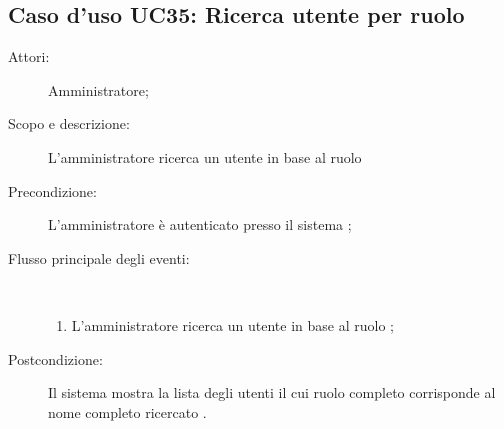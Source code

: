 \subsection{Caso d'uso UC35: Ricerca utente per ruolo}\begin{description}
	\item[Attori:] Amministratore;
	\item[Scopo e descrizione:] L'amministratore ricerca un utente in base al ruolo 
	
	\item[Precondizione:] L'amministratore è autenticato presso il sistema
	;
	
	\item[Flusso principale degli eventi:] \ 
	\begin{enumerate}
		\item L'amministratore ricerca un utente in base al ruolo 
		;
		
	\end{enumerate}
	\item[Postcondizione:] Il sistema mostra la lista degli utenti il cui ruolo completo corrisponde al nome completo ricercato
	.
\end{description}
